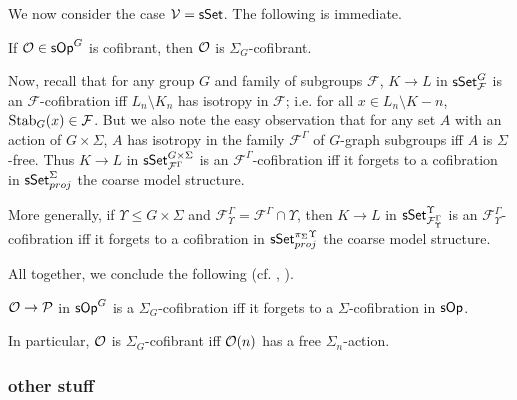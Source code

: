 \documentclass[a4paper,10pt
,draft
]{article}%
\renewcommand{\F}{\mathcal F}
\renewcommand{\1}{\eta}%
\begin{document}
We now consider the case $\mathcal V = \mathsf{sSet}$.
The following is immediate.
\begin{corollary}
      If $\mathcal{O} \in \mathsf{sOp}^G$ is cofibrant, then $\mathcal{O}$ is $\Sigma_G$-cofibrant.
\end{corollary}


Now, recall that for any group $G$ and family of subgroups $\F$,
$K \to L$ in $\sSet^{G}_\F$ is an $\F$-cofibration iff $L_n \setminus K_n$ has isotropy in $\F$; i.e. for all $x \in L_n \setminus K-n$, $\Stab_{G}(x) \in \F$.
% 
But we also note the easy observation that for any set $A$ with an action of $G \times \Sigma$,
$A$ has isotropy in the family $\F^\Gamma$ of $G$-graph subgroups
iff
$A$ is $\Sigma$-free.
% 
Thus $K \to L$ in $\sSet^{G \times \Sigma}_{\F^\Gamma}$ is an $\F^\Gamma$-cofibration
iff
it forgets to a cofibration in $\mathsf{sSet}^\Sigma_{proj}$ the coarse model structure.

More generally, if $\Upsilon \leq G \times \Sigma$ and $\F^\Gamma_{\Upsilon} = \F^\Gamma \cap \Upsilon$,
then $K \to L$ in $\sSet^{\Upsilon}_{\F^\Gamma_\Upsilon}$ is an $\F^\Gamma_\Upsilon$-cofibration
iff
it forgets to a cofibration in $\mathsf{sSet}^{\pi_{\Sigma}\Upsilon}_{proj}$ the coarse model structure.

All together, we conclude the following (cf. \cite[Remark 6.7]{Per18}, \cite[discussion before Thm. 2.31]{BP_edss}).
\begin{proposition}
      \label{SGS_COF_PROP}
      $\mathcal{O} \to \mathcal{P}$ in $\mathsf{sOp}^G$ is a $\Sigma_G$-cofibration iff it forgets to a $\Sigma$-cofibration in $\mathsf{sOp}$.

      In particular, $\mathcal{O}$ is $\Sigma_G$-cofibrant iff $\mathcal{O}(n)$ has a free $\Sigma_n$-action.
\end{proposition}



















\subsubsection{other stuff}

\end{document}
